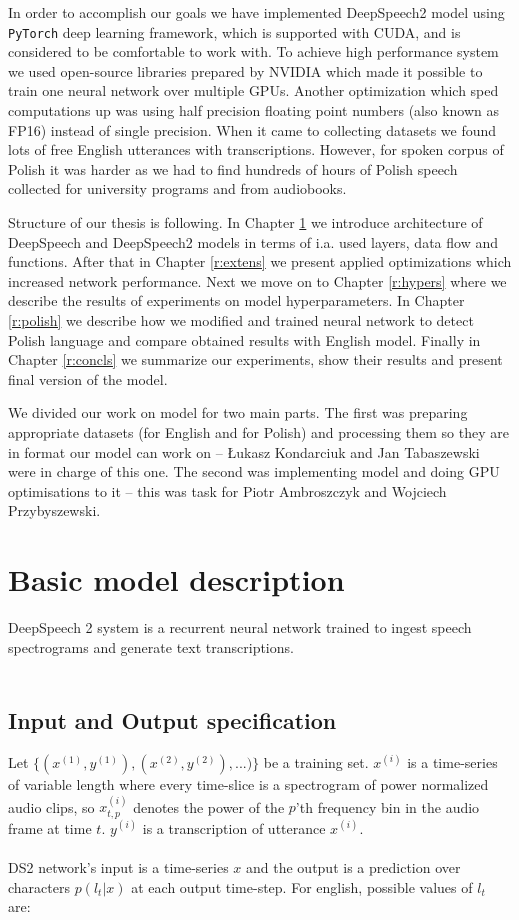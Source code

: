 \documentclass[licencjacka,en]{pracamgr}
\begin{document}
In order to accomplish our goals we have implemented DeepSpeech2 model using \texttt{PyTorch} deep learning framework, which is supported with CUDA, and is considered to be comfortable to work with. To achieve high performance system we used open-source libraries prepared by NVIDIA which made it possible to train one neural network over multiple GPUs. Another optimization which sped computations up was using half precision floating point numbers (also known as FP16) instead of single precision.  When it came to collecting datasets we found lots of free English utterances with transcriptions. However, for spoken corpus of Polish it was harder as we had to find hundreds of hours of Polish speech collected for university programs and from audiobooks.

Structure of our thesis is following. In Chapter \ref{r:desc} we introduce architecture of DeepSpeech and DeepSpeech2 models in terms of i.a. used layers, data flow and functions. After that in Chapter \ref{r:extens} we present applied optimizations which increased network performance. Next we move on to Chapter \ref{r:hypers} where we describe the results of experiments on model hyperparameters. In Chapter \ref{r:polish} we describe how we modified and trained neural network to detect Polish language and compare obtained results with English model. Finally in Chapter \ref{r:concls} we summarize our experiments, show their results and present final version of the model.    

We divided our work on model for two main parts. The first was preparing appropriate datasets (for English and for Polish) and processing them so they are in format our model can work on -- Łukasz Kondarciuk and Jan Tabaszewski were in charge of this one. The second was implementing model and doing GPU optimisations to it -- this was task for Piotr Ambroszczyk and Wojciech Przybyszewski.
\chapter{Basic model description}\label{r:desc}

DeepSpeech 2 system is a recurrent neural network trained to ingest speech spectrograms and generate text transcriptions.\\\\

\section{Input and Output specification}
Let $\{(x^{(1)}, y^{(1)}), (x^{(2)}, y^{(2)}), ...)\}$ be a training set. $x^{(i)}$ is a time-series of variable length where every time-slice is a spectrogram of power
normalized audio clips, so $x^{(i)}_{t,p}$ denotes the power of the $p$’th frequency bin in the audio frame at time $t$. $y^{(i)}$ is a transcription of utterance $x^{(i)}$.\\\\
DS2 network's input is a time-series $x$ and the output is a prediction over characters $p(l_t|x)$ at each output time-step. For english, possible values of $l_t$ are:
\end{document}
